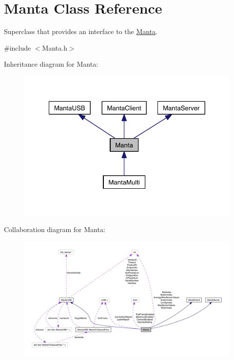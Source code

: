 \hypertarget{classManta}{\section{\-Manta \-Class \-Reference}
\label{classManta}
}


\-Superclass that provides an interface to the \hyperlink{classManta}{\-Manta}.  




{\ttfamily \#include $<$\-Manta.\-h$>$}



\-Inheritance diagram for \-Manta\-:
\nopagebreak
\begin{figure}[H]
\begin{center}
\leavevmode
\includegraphics[width=322pt]{classManta__inherit__graph}
\end{center}
\end{figure}


\-Collaboration diagram for \-Manta\-:\nopagebreak
\begin{figure}[H]
\begin{center}
\leavevmode
\includegraphics[width=350pt]{classManta__coll__graph}
\end{center}
\end{figure}
